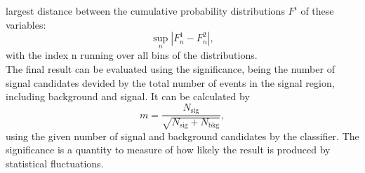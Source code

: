 largest distance between the cumulative probability distributions $F^i$ of these variables:
\begin{equation}
    \label{eq:Kolmogorov}
    \sup\limits_{n} | F_n^1 - F_n^2 |,
\end{equation}
with the index n running over all bins of the distributions.\\
The final result can be evaluated using the significance, being the number of signal candidates devided by the total number of events in the signal region, including background and signal.
It can be calculated by
\begin{equation}
    \label{eq:sign}
    m = \frac{N_{\mathrm{sig}}}{\sqrt{N_{\mathrm{sig}} + N_{\mathrm{bkg}}}},
\end{equation}
using the given number of signal and background candidates by the classifier. The significance is a quantity to measure of how likely the result is produced by statistical fluctuations.
